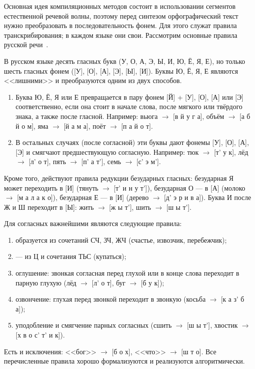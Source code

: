 Основная идея компиляционных методов состоит в использовании сегментов
естественной речевой волны, поэтому перед синтезом орфографический текст
нужно преобразовать в последовательность фонем. Для этого служат правила
транскрибирования; в каждом языке они свои. Рассмотрим основные правила
русской речи~\cite{pecheneva,zinder}.

В русском языке десять гласных букв (У, О, А, Э, Ы, И, Ю, Ё, Я, Е), но
только шесть гласных фонем ([У], [О], [А], [Э], [Ы], [И]). Буквы Ю, Ё, Я,
Е являются <<лишними>> и преобразуются одним из двух способов.

\begin{enumerate}
	\item Буква Ю, Ё, Я или Е превращается в пару фонем [Й] + [У], [О],
	[А] или [Э] соответственно, если она стоит в начале слова, после
	мягкого или твёрдого знака, а также после гласной. Например:
	вьюга \(\to\) [в й у г а], объём \(\to\) [а б й о м],
	яма \(\to\) [й а м а], поёт \(\to\) [п а й о т].
	\item В остальных случаях (после согласной) эти буквы дают фонемы
	[У], [О], [А], [Э] и смягчают предшествующую согласную. Например:
	тюк \(\to\) [т' у к], лёд \(\to\) [л' о т], пять \(\to\) [п' а т'],
	семь \(\to\) [с' э м'].
\end{enumerate}

Кроме того, действуют правила редукции безударных гласных: безударная
Я может переходить в [И] (тянуть \(\to\) [т' и н у т']), безударная О ---
в [А] (молоко \(\to\) [м а л а к о]), безударная Е --- в [И]
(дерево \(\to\) [д' э р и в а]). Буква И после Ж и Ш переходит в [Ы]:
жить \(\to\) [ж ы т'], шить \(\to\) [ш ы т'].

Для согласных важнейшими являются следующие правила:
\begin{enumerate}
	\item [Щ] образуется из сочетаний СЧ, ЗЧ, ЖЧ (счастье, извозчик,
	перебежчик);
	\item [Ц] --- из Ц и сочетания ТЬС (купаться);
	\item оглушение: звонкая согласная перед глухой или в конце слова
	переходит в парную глухую (лёд \(\to\) [л' о т], буг \(\to\) [б у к]);
	\item озвончение: глухая перед звонкой переходит в звонкую
	(косьба \(\to\) [к а з' б а]);
	\item уподобление и смягчение парных согласных (сшить \(\to\)
	[ш ы т'], хвостик \(\to\) [х в о с' т' и к]).
\end{enumerate}
Есть и исключения: <<бог>> \(\to\) [б о х], <<что>> \(\to\) [ш т о]. Все
перечисленные правила хорошо формализуются и реализуются алгоритмически.

